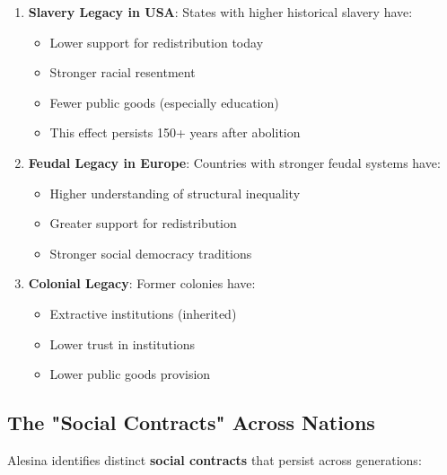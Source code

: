 \begin{enumerate}
\item \textbf{Slavery Legacy in USA}: States with higher historical slavery have:
   \begin{itemize}
   \item Lower support for redistribution today
   \item Stronger racial resentment
   \item Fewer public goods (especially education)
   \item This effect persists 150+ years after abolition
   \end{itemize}

\item \textbf{Feudal Legacy in Europe}: Countries with stronger feudal systems have:
   \begin{itemize}
   \item Higher understanding of structural inequality
   \item Greater support for redistribution
   \item Stronger social democracy traditions
   \end{itemize}

\item \textbf{Colonial Legacy}: Former colonies have:
   \begin{itemize}
   \item Extractive institutions (inherited)
   \item Lower trust in institutions
   \item Lower public goods provision
   \end{itemize}

\end{enumerate}

\subsection{The "Social Contracts" Across Nations}

Alesina identifies distinct \textbf{social contracts} that persist across generations:

